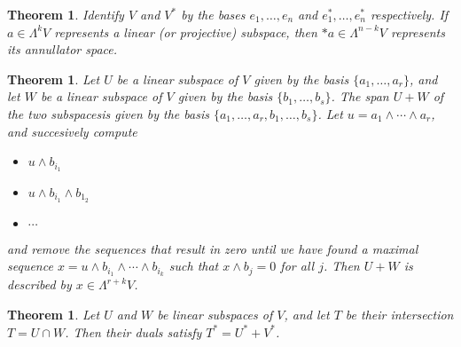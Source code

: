 \documentclass[a4paper,12pt]{book}
\theoremstyle{plain}
\newtheorem{thm}[equation]{Theorem}
\theoremstyle{definition}
\begin{document}
\begin{thm}
	Identify \( V \) and \( V^* \) by the bases \( e_1, \ldots, e_n \) and
	\( e_1^*, \ldots, e_n^* \) respectively. If \( a \in \Lambda^k V \) represents a linear
	(or projective) subspace, then \( * a \in \Lambda^{n-k} V \) represents its annullator space.
\end{thm}

\begin{thm}
	\label{findingspan}
	Let \( U \) be a linear subspace of \( V \) given by the basis
	\( \{a_1, \ldots, a_r\} \), and let
	\( W \)	be a linear subspace of \( V \) given by the basis \( \{b_1, \ldots, b_s\} \).
	The span
	\( U + W \) of the two subspacesis given by the basis
	\( \{a_1, \ldots, a_r, b_1, \ldots, b_s\} \).
	Let \( u = a_1 \wedge \cdots \wedge a_r \), and succesively compute
	\begin{itemize}
		\item \( u \wedge b_{i_1} \)
		\item \( u \wedge b_{i_1} \wedge b_{1_2} \)
		\item \( \cdots \)
	\end{itemize}
	and remove the sequences that result in zero until we have found a maximal sequence
	\( x = u \wedge b_{i_1} \wedge \cdots \wedge b_{i_k} \) such that \( x \wedge b_j = 0 \) for all
	\( j \).
	Then \( U + W \) is described by \( x \in \Lambda^{r+k} V \).
\end{thm}

\begin{thm}
	\label{dualrelation}
	Let \( U \) and \( W \) be linear subspaces of \( V \), and let \( T \) be their intersection
	\( T = U \cap W \). Then their duals satisfy \( T^* = U^* + V^* \).
\end{thm}

\end{document}
